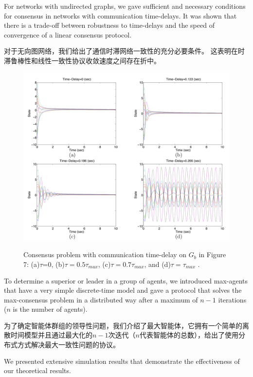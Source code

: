 \documentclass{article}
\begin{document}
{\color[gray]{0.5}
For networks with undirected graphs, we gave suﬃcient and necessary conditions for consensus in networks with communication time-delays. 
It was shown that there is a trade-oﬀ between robustness to time-delays and the speed of convergence of a linear consensus protocol. 
}

对于无向图网络，我们给出了通信时滞网络一致性的充分必要条件。
这表明在时滞鲁棒性和线性一致性协议收敛速度之间存在折中。

\begin{figure}[htbp]
    \centering
    \includegraphics[width=14.5cm]{figures/Fig8-ConsensusProblem.jpeg}
    \label{ConsensusProblem}
    \caption{Consensus problem with communication time-delay on $G_b$ in Figure 7: (a)$\tau$=0, (b)$\tau=0.5\tau_{max}$, (c)$\tau=0.7\tau_{max}$, and (d)$\tau=\tau_{max}$ .}
\end{figure}

{\color[gray]{0.5}
To determine a superior or leader in a group of agents, we introduced max-agents that have a very simple discrete-time model and gave a protocol that solves the max-consensus problem in a distributed way after a maximum of $n−1$ iterations ($n$ is the number of agents).
}

为了确定智能体群组的领导性问题，我们介绍了最大智能体，它拥有一个简单的离散时间模型并且通过最大化的$n-1$次迭代（$n$代表智能体的总数），给出了使用分布式方式解决最大一致性问题的协议。

{\color[gray]{0.5}
We presented extensive simulation results that demonstrate the eﬀectiveness of our theoretical results.
}
\end{document}
